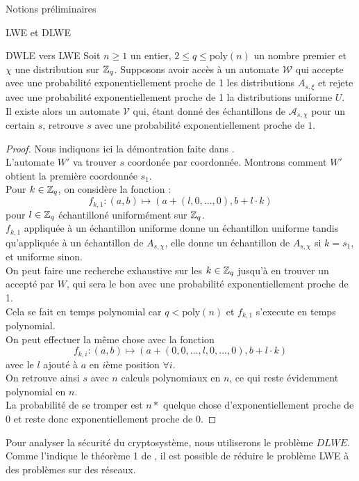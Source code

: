 \begin{section}{Notions préliminaires}
\begin{subsection}{LWE et DLWE}
\begin{prop}{DWLE vers LWE}
	Soit $n \geqslant 1$ un entier, $2 \leqslant q \leqslant \text{poly}(n)$ un nombre premier et $\chi$ une distribution sur $\mathbb{Z}_q$. Supposons avoir accès à un automate $\mathcal{W}$ qui accepte avec une probabilité exponentiellement proche de 1 les distributions $A_{s, \xi}$ et rejete avec une probabilité exponentiellement proche de 1 la distributions uniforme $U$. \\
	Il existe alors un automate $\mathcal{V}$ qui, étant donné des échantillons de $\mathcal{A}_{s,\chi}$ pour un certain $s$, retrouve $s$ avec une probabilité exponentiellement proche de $1$.
	\end{prop}
	\begin{proof}
	Nous indiquons ici la démontration faite dans \cite{STOC:Regev05}. \\
	L'automate $W'$ va trouver $s$ coordonée par coordonnée. Montrons comment $W'$ obtient la première coordonnée $s_1$. \\
	Pour $k \in \mathbb{Z}_q$, on considère la fonction :
	\[f_{k,1}: (a,b) \mapsto (a + (l, 0, ..., 0), b + l \cdot k) \]
	pour $l\in \mathbb{Z}_q$ échantilloné uniformément sur $\mathbb{Z}_q$. \\
	$f_{k,1}$ appliquée à un échantillon uniforme donne un échantillon uniforme tandis qu'appliquée à un échantillon de $A_{s, \chi}$, elle donne un échantillon de $A_{s, \chi}$ si $k = s_1$, et uniforme sinon. \\
	On peut faire une recherche exhaustive sur les $k \in \mathbb{Z}_q$ jusqu'à en trouver un accepté par $W$, qui sera le bon avec une probabilité exponentiellement proche de 1. \\
	Cela se fait en temps polynomial car $q < \text{poly}(n)$ et $f_{k,1}$ s'execute en temps polynomial. \\
	On peut effectuer la même chose avec la fonction
	\[f_{k,i}: (a,b) \mapsto (a + (0, 0, ..., l, 0, ..., 0), b + l \cdot k) \]
	avec le $l$ ajouté à $a$ en $i$ème position $\forall i$. \\
	On retrouve ainsi $s$ avec $n$ calculs polynomiaux en $n$, ce qui reste évidemment polynomial en $n$. \\
	La probabilité de se tromper est $n *$ quelque chose d'exponentiellement proche de 0 et reste donc exponentiellement proche de 0.
	\end{proof}

	Pour analyser la sécurité du cryptosystème, nous utiliserons le
	problème $DLWE$. 
	Comme l'indique le théorème 1 de \cite{C:GenSahWat13}, il est
	possible de réduire le problème LWE à des problèmes sur des réseaux.



\end{subsection}
\end{section}
